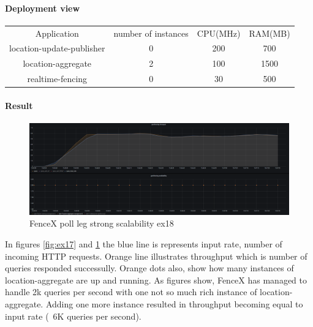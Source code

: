 \documentclass[a4]{report}
\begin{document}
    \paragraph{Deployment view}
    \begin{center}
        \begin{tabular}{ c c c c }
            Application               &  number of instances     & CPU(MHz)  & RAM(MB)    \\
            location-update-publisher &          0               & 200       &   700      \\
            location-aggregate        &          2               & 100      &   1500     \\
            realtime-fencing          &          0               & 30       &   500       \\
        \end{tabular}
    \end{center}

    \paragraph{Result}
    \begin{figure}[ht]
        \caption{FenceX poll leg strong scalability ex18}
        \label{fig:ex18}
        \includegraphics[scale=0.4]{images/evaluation/ex18-benchmarking-ongoing-2per4sec.png}
    \end{figure}

    In figures \ref{fig:ex17} and \ref{fig:ex18} the blue line is represents input rate, number of incoming HTTP
    requests.
    Orange line illustrates throughput which is number of queries responded successully.
    Orange dots also, show how many instances of location-aggregate are up and running.
    As figures show, FenceX has managed to handle 2k queries
    per second with one not so much rich instance of location-aggregate.
    Adding one more instance resulted in throughput becoming equal to input rate (~6K queries per second).
\end{document}
